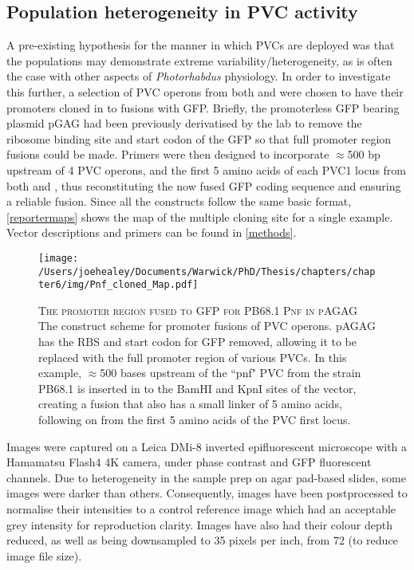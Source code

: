 \subsection{Population heterogeneity in PVC activity}\label{heterogeneity}
A pre-existing hypothesis for the manner in which PVCs are deployed was that the populations may demonstrate extreme variability/heterogeneity, as is often the case with other aspects of \emph{Photorhabdus} physiology. In order to investigate this further, a selection of PVC operons from both \Plum{} and \Pasy{} were chosen to have their promoters cloned in to fusions with GFP. Briefly, the promoterless GFP bearing plasmid pGAG had been previously derivatised by the lab to remove the ribosome binding site and start codon of the GFP so that full promoter region fusions could be made. Primers were then designed to incorporate $\approx$500 bp upstream of 4 PVC operons, and the first 5 amino acids of each PVC1 locus from both \Plum{} and \Pasy, thus reconstituting the now fused GFP coding sequence and ensuring a reliable fusion. Since all the constructs follow the same basic format, \vref{reportermaps} shows the map of the multiple cloning site for a single example. Vector descriptions and primers can be found in \vref{methods}.


\begin{figure}[h]
    \texttt{[image: /Users/joehealey/Documents/Warwick/PhD/Thesis/chapters/chapter6/img/Pnf\_cloned\_Map.pdf]}
    \captionsetup{singlelinecheck=off, justification=justified, font=footnotesize, aboveskip=10pt}
    \caption[Example of promoter fusions for PVC operons]{\textsc{\normalsize The promoter region fused to GFP for \Pasy{} PB68.1 Pnf in pAGAG} \vspace{0.1cm} \newline The construct scheme for promoter fusions of PVC operons. pAGAG has the RBS and start codon for GFP removed, allowing it to be replaced with the full promoter region of various PVCs. In this example, $\approx$500 bases upstream of the ``pnf" PVC from the \Pasy{} strain PB68.1 is inserted in to the BamHI and KpnI sites of the vector, creating a fusion that also has a small linker of 5 amino acids, following on from the first 5 amino acids of the PVC first locus.}
\label{rfahlocus}
\end{figure}




Images were captured on a Leica DMi-8 inverted epifluorescent microscope with a Hamamatsu Flash4 4K camera, under phase contrast and GFP fluorescent channels. Due to heterogeneity in the sample prep on agar pad-based slides, some images were darker than others. Consequently, images have been postprocessed to normalise their intensities to a control reference image which had an acceptable grey intensity for reproduction clarity. Images have also had their colour depth reduced, as well as being downsampled to 35 pixels per inch, from 72 (to reduce image file size).

